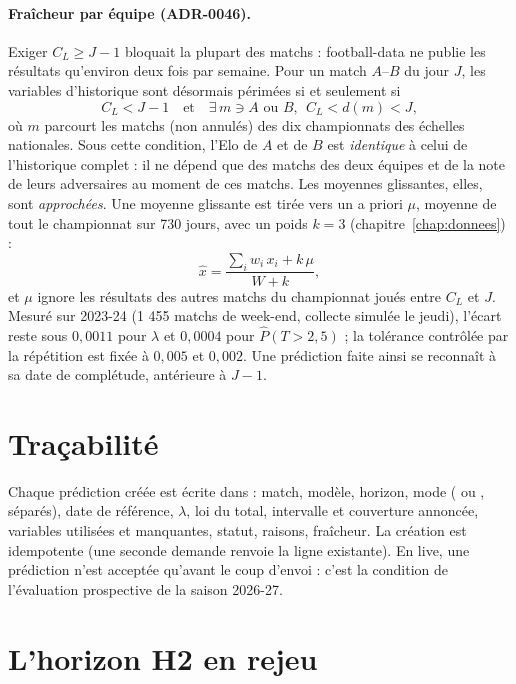 \paragraph{Fraîcheur par équipe (ADR-0046).} Exiger \(C_L \ge J - 1\) bloquait la plupart des matchs :
football-data ne publie les résultats qu'environ deux fois par semaine. Pour un match \(A\)--\(B\) du
jour \(J\), les variables d'historique sont désormais périmées si et seulement si
\[
  C_L < J - 1
  \quad\text{et}\quad
  \exists\, m \ni A \text{ ou } B,\ \ C_L < d(m) < J,
\]
où \(m\) parcourt les matchs (non annulés) des dix championnats des échelles nationales. Sous cette
condition, l'Elo de \(A\) et de \(B\) est \emph{identique} à celui de l'historique complet : il ne dépend
que des matchs des deux équipes et de la note de leurs adversaires au moment de ces matchs. Les moyennes
glissantes, elles, sont \emph{approchées}. Une moyenne glissante est tirée vers un a priori \(\mu\),
moyenne de tout le championnat sur 730 jours, avec un poids \(k = 3\) (chapitre~\ref{chap:donnees}) :
\[
  \hat{x} = \frac{\sum_i w_i\, x_i + k\, \mu}{W + k},
\]
et \(\mu\) ignore les résultats des autres matchs du championnat joués entre \(C_L\) et \(J\). Mesuré
sur 2023-24 (1 455 matchs de week-end, collecte simulée le jeudi), l'écart reste sous \(0{,}0011\) pour
\(\lambda\) et \(0{,}0004\) pour \(\hat P(T > 2{,}5)\) ; la tolérance contrôlée par la répétition est fixée à
\(0{,}005\) et \(0{,}002\). Une prédiction faite ainsi se reconnaît à sa date de complétude, antérieure à
\(J - 1\).

\section{Traçabilité}
\label{sec:inference-tracabilite}

Chaque prédiction créée est écrite dans  : match, modèle, horizon, mode
( ou , séparés), date de référence, \(\lambda\), loi du total, intervalle et
couverture annoncée, variables utilisées et manquantes, statut, raisons, fraîcheur. La création est
idempotente (une seconde demande renvoie la ligne existante). En live, une prédiction n'est acceptée
qu'avant le coup d'envoi : c'est la condition de l'évaluation prospective de la saison 2026-27.

\section{L'horizon H2 en rejeu}
\label{sec:inference-h2}

